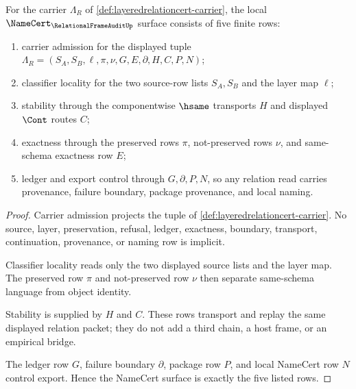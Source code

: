 \begin{theorem}
\label{thm:layeredrelationcert-namecert-obligation-surface}
For the carrier $\Lambda_R$ of \autoref{def:layeredrelationcert-carrier}, the local $\NameCert_{\RelationalFrameAuditUp}$ surface consists of five finite rows:
\begin{enumerate}
\item carrier admission for the displayed tuple $\Lambda_R=(S_A,S_B,\ell,\pi,\nu,G,E,\partial,H,C,P,N)$;
\item classifier locality for the two source-row lists $S_A,S_B$ and the layer map $\ell$;
\item stability through the componentwise $\hsame$ transports $H$ and displayed $\Cont$ routes $C$;
\item exactness through the preserved rows $\pi$, not-preserved rows $\nu$, and same-schema exactness row $E$;
\item ledger and export control through $G,\partial,P,N$, so any relation read carries provenance, failure boundary, package provenance, and local naming.
\end{enumerate}
\end{theorem}
\begin{proof}
Carrier admission projects the tuple of \autoref{def:layeredrelationcert-carrier}. No source, layer, preservation, refusal, ledger, exactness, boundary, transport, continuation, provenance, or naming row is implicit.

Classifier locality reads only the two displayed source lists and the layer map. The preserved row $\pi$ and not-preserved row $\nu$ then separate same-schema language from object identity.

Stability is supplied by $H$ and $C$. These rows transport and replay the same displayed relation packet; they do not add a third chain, a host frame, or an empirical bridge.

The ledger row $G$, failure boundary $\partial$, package row $P$, and local NameCert row $N$ control export. Hence the NameCert surface is exactly the five listed rows.
\end{proof}

